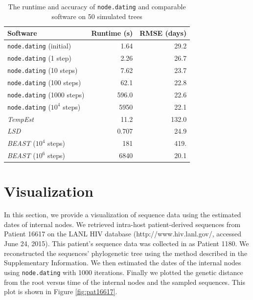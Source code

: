 \documentclass{bioinfo}
\newcommand{\code}[1]{{\tt #1}}
\begin{document}
\begin{table}[t]
	\caption[Runtime and accuracy]{The runtime and accuracy of \code{node.dating} and comparable software on 50 simulated trees}
	\label{tab:runtime}
	\centering
	\begin{tabular}{lrr}
		\hline
		Software & Runtime (s) & RMSE (days) \\
		\hline
		\code{node.dating} (initial) & 1.64 & 29.2 \\
		\code{node.dating} (1 step) & 2.26 & 26.7 \\
		\code{node.dating} (10 steps) & 7.62 & 23.7 \\
		\code{node.dating} (100 steps) & 62.1 & 22.8 \\
		\code{node.dating} (1000 steps) & 596.0 & 22.6 \\
		\code{node.dating} ($10^4$ steps) & 5950 & 22.1 \\
		\emph{TempEst} & 11.2 & 132.0 \\
		\emph{LSD} & 0.707 & 24.9 \\
		\emph{BEAST} ($10^4$ steps) & 181 & 419. \\
		\emph{BEAST} ($10^6$ steps) & 6840 & 20.1 \\
		\hline
	\end{tabular}
\end{table}

\vspace*{-15pt}

\section{Visualization} \label{sec:vis}
In this section, we provide a visualization of sequence data using the estimated dates of internal nodes.
We retrieved intra-host patient-derived sequences from Patient 16617 on the LANL HIV database (http://www.hiv.lanl.gov/, accessed June 24, 2015).
This patient's sequence data was collected in \cite{Llewellyn06} as Patient 1180.
We reconstructed the sequences' phylogenetic tree using the method described in the Supplementary Information.
We then estimated the dates of the internal nodes using \code{node.dating} with 1000 iterations. 
Finally we plotted the genetic distance from the root versus time of the internal nodes and the sampled sequences. 
This plot is shown in Figure \ref{fig:pat16617}.

\vspace*{-15pt}
\end{document}
